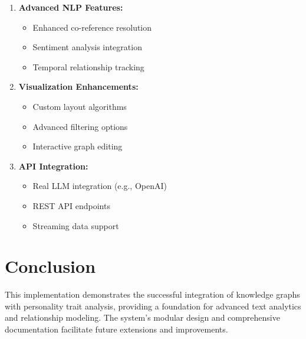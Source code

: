 \documentclass[11pt]{article}
\begin{document}
\begin{enumerate}
    \item \textbf{Advanced NLP Features:}
    \begin{itemize}
        \item Enhanced co-reference resolution
        \item Sentiment analysis integration
        \item Temporal relationship tracking
    \end{itemize}
    
    \item \textbf{Visualization Enhancements:}
    \begin{itemize}
        \item Custom layout algorithms
        \item Advanced filtering options
        \item Interactive graph editing
    \end{itemize}
    
    \item \textbf{API Integration:}
    \begin{itemize}
        \item Real LLM integration (e.g., OpenAI)
        \item REST API endpoints
        \item Streaming data support
    \end{itemize}
\end{enumerate}

\section{Conclusion}
This implementation demonstrates the successful integration of knowledge graphs with personality trait analysis, providing a foundation for advanced text analytics and relationship modeling. The system's modular design and comprehensive documentation facilitate future extensions and improvements.
\end{document}
